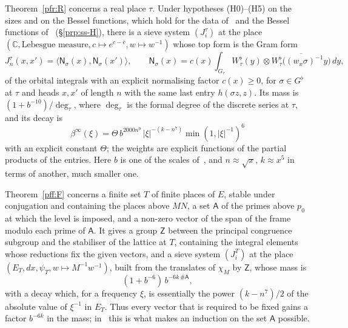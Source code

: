 \documentclass[10pt]{amsart}
\theoremstyle{definition}
\theoremstyle{remark}
\newcommand{\C}{\mathbb C}
\begin{document}
Theorem~\ref{pfr:R} concerns a real place $\tau$. Under hypotheses (H0)--(H5) on the sizes and on
the Bessel functions, which hold for the data of~\cite{P46} and the Bessel functions
of~\cite{P51} (\S\ref{prp:ss-H}), there is a sieve system $(J^\tau_i)$ at the place $(\C,
\text{Lebesgue measure},c\mapsto e^{c-\bar c},w\mapsto w^{-1})$ whose top form is the Gram form
\[
J^\tau_n(x,x')=\bigl\langle\mathsf N_\sigma(x),\mathsf N_\sigma(x')\bigr\rangle,\qquad
\mathsf N_\sigma(x)=c(x)\int_{G_\tau}W^\flat_\tau(y)\otimes\overline{W^\flat_\tau\bigl((w_x\sigma)^{-1}
y\bigr)}\,dy ,
\]
of the orbital integrals with an explicit normalising factor $c(x)\ge0$, for $\sigma\in G^\flat$
at $\tau$ and heads $x,x'$ of length $n$ with the same last entry $h(\sigma z,z)$. Its mass is $(1+b^{-10})/\deg_\tau$, where
$\deg_\tau$ is the formal degree of the discrete series at $\tau$, and its decay is
\[
\beta^\infty(\xi)=\Theta\,b^{2000n^9}\,|\xi|^{-(k-n^7)}\min(1,|\xi|^{-1})^6
\]
with an explicit constant $\Theta$; the weights are explicit functions of the partial products of
the entries. Here $b$ is one of the scales of~\cite{P46}, and $n\approx\sqrt x$, $k\approx x^5$ in
terms of another, much smaller one.

Theorem~\ref{pff:F} concerns a finite set $T$ of finite places of $E$, stable under conjugation
and containing the places above $MN$, a set $\mathsf A$ of the primes above $p_0$ at which the
level is imposed, and a non-zero vector of the span of the frame modulo each prime of
$\mathsf A$. It gives a group $\mathsf Z$ between the principal congruence subgroup and the
stabiliser of the lattice at $T$, containing the integral elements whose reductions fix the
given vectors, and a sieve system $(J^T_i)$ at the place $(E_T,dx,\psi_T,w\mapsto M^{-1}w^{-1})$,
built from the translates of $\chi_M$ by $\mathsf Z$, whose mass is
\[
(1+b^{-6})\,b^{-6k\,\#\mathsf A},
\]
with a decay which, for a frequency $\xi$, is essentially the power $(k-n^7)/2$ of the absolute
value of $\xi^{-1}$ in $E_T$. Thus every vector that is required to be fixed gains a factor
$b^{-6k}$ in the mass; in~\cite{P51} this is what makes an induction on the set $\mathsf A$
possible.
\end{document}

